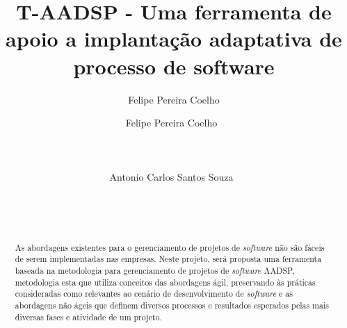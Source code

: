 \documentclass{acm_proc_article-sp}
\author{Felipe Pereira Coelho}
\begin{document}
\title{ T-AADSP - Uma ferramenta de apoio a implantação adaptativa de processo de software}

\author{
%
%
\alignauthor
Felipe Pereira Coelho\ \\
       \\
       \\
       \\
\alignauthor
Antonio Carlos Santos Souza\ \\
       \\
       \\
       \\
}


\maketitle
\begin{abstract}
As abordagens existentes para o gerenciamento de projetos de \textit{software} não são fáceis de serem implementadas nas empresas. Neste projeto, será proposta uma ferramenta baseada na metodologia para gerenciamento de projetos de \textit{software} AADSP, metodologia esta que utiliza conceitos das abordagens ágil, preservando às práticas consideradas como relevantes ao cenário de desenvolvimento de \textit{software} e as abordagens não ágeis que definem diversos processos e resultados esperados pelas mais diversas fases e atividade de um projeto. 
\end{abstract}

\end{document}
